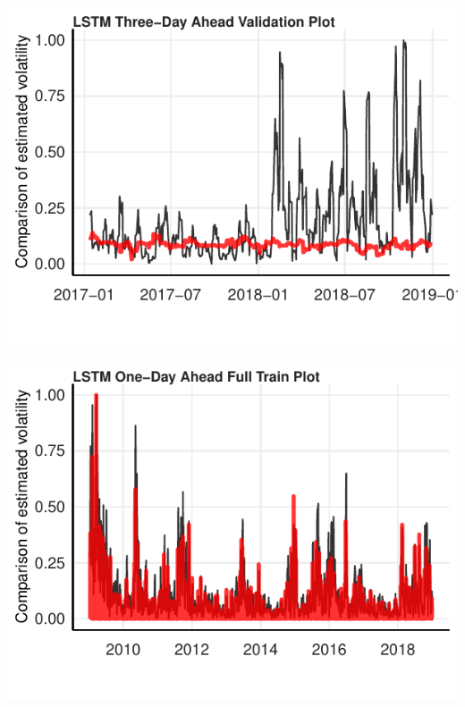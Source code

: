 \documentclass[11pt,preprint, authoryear]{elsarticle}
\let\origfigure\figure
\let\endorigfigure\endfigure
\renewenvironment{figure}[1][2] {
    \expandafter\origfigure\expandafter[H]
} {
    \endorigfigure
}
\numberwithin{equation}{section}
\numberwithin{figure}{section}
\numberwithin{table}{section}
\begin{document}
\begin{figure}[H]

{\centering \includegraphics{Essay_files/figure-latex/plot_8-1} 

}

\caption{LSTM Three-Day Ahead Validation Forecast}\label{fig:plot_8}
\end{figure}

\begin{figure}[H]

{\centering \includegraphics{Essay_files/figure-latex/plot_9-1} 

}

\caption{LSTM One-Day Ahead Full Training Forecast}\label{fig:plot_9}
\end{figure}
\end{document}
